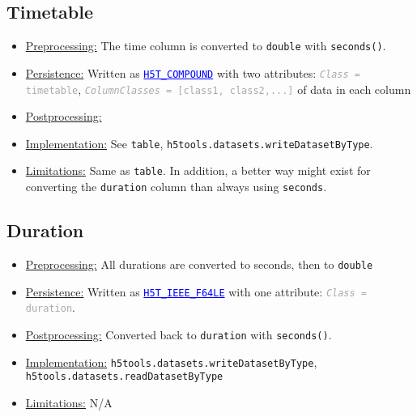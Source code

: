 \documentclass[11pt]{exam}
\newcommand\myurl[1]{\textcolor{blue}{\underline{#1}}}
\newcommand\myfcn[1]{\colorbox{codegray}{\textcolor{codeblue}{\texttt{#1}}}}
\newcommand\matfcn[1]{\textcolor{darkteal}{\texttt{#1}}}
\newcommand\hdftype[1]{\texttt{\myurl{#1}}}
\newcommand\myatt[2]{\textcolor{darkgray}{\texttt{\textit{#1} = #2}}}
\begin{document}
		\subsection{Timetable}
		\noindent
		\begin{itemize}
			\item \underline{Preprocessing:} The time column is converted to \texttt{double} with \matfcn{seconds()}. 
			\item \underline{Persistence:} Written as \hdftype{H5T\_COMPOUND} with two attributes: \myatt{Class}{timetable}, \myatt{ColumnClasses}{[class1, class2,...]} of data in each column
			\item \underline{Postprocessing:}
			\item \underline{Implementation:} See \texttt{table}, \myfcn{h5tools.datasets.writeDatasetByType}. 
			\item \underline{Limitations:} Same as \texttt{table}. In addition, a better way might exist for converting the \texttt{duration} column than always using \matfcn{seconds}.
		\end{itemize}

		\subsection{Duration}
		\noindent
		\begin{itemize}
			\item \underline{Preprocessing:} All durations are converted to seconds, then to \texttt{double}
			\item \underline{Persistence:} Written as \hdftype{H5T\_IEEE\_F64LE} with one attribute: \myatt{Class}{duration}.
			\item \underline{Postprocessing:} Converted back to \texttt{duration} with \matfcn{seconds()}.
			\item \underline{Implementation:} \myfcn{h5tools.datasets.writeDatasetByType}, \myfcn{h5tools.datasets.readDatasetByType}
			\item \underline{Limitations:} N/A
		\end{itemize}
\end{document}
